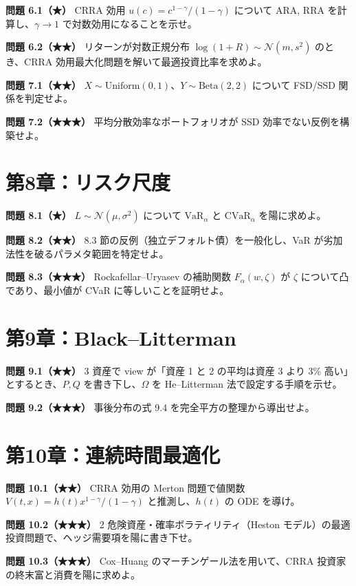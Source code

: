 \documentclass[11pt,a4paper]{report}
\begin{document}
\textbf{問題 6.1（★）} CRRA 効用 $u(c) = c^{1-\gamma}/(1-\gamma)$ について ARA, RRA を計算し、$\gamma \to 1$ で対数効用になることを示せ。

\textbf{問題 6.2（★★）} リターンが対数正規分布 $\log(1 + R) \sim \mathcal{N}(m, s^2)$ のとき、CRRA 効用最大化問題を解いて最適投資比率を求めよ。

\textbf{問題 7.1（★★）} $X \sim \mathrm{Uniform}(0,1)$、$Y \sim \mathrm{Beta}(2, 2)$ について FSD/SSD 関係を判定せよ。

\textbf{問題 7.2（★★★）} 平均分散効率なポートフォリオが SSD 効率でない反例を構築せよ。

\section{第8章：リスク尺度}

\textbf{問題 8.1（★）} $L \sim \mathcal{N}(\mu, \sigma^2)$ について $\mathrm{VaR}_\alpha$ と $\mathrm{CVaR}_\alpha$ を陽に求めよ。

\textbf{問題 8.2（★★）} 8.3 節の反例（独立デフォルト債）を一般化し、VaR が劣加法性を破るパラメタ範囲を特定せよ。

\textbf{問題 8.3（★★★）} Rockafellar–Uryasev の補助関数 $F_\alpha(w, \zeta)$ が $\zeta$ について凸であり、最小値が CVaR に等しいことを証明せよ。

\section{第9章：Black–Litterman}

\textbf{問題 9.1（★★）} 3 資産で view が「資産 1 と 2 の平均は資産 3 より 3\% 高い」とするとき、$P, Q$ を書き下し、$\Omega$ を He–Litterman 法で設定する手順を示せ。

\textbf{問題 9.2（★★★）} 事後分布の式 9.4 を完全平方の整理から導出せよ。

\section{第10章：連続時間最適化}

\textbf{問題 10.1（★★）} CRRA 効用の Merton 問題で値関数 $V(t, x) = h(t) x^{1-\gamma}/(1-\gamma)$ と推測し、$h(t)$ の ODE を導け。

\textbf{問題 10.2（★★★）} 2 危険資産・確率ボラティリティ（Heston モデル）の最適投資問題で、ヘッジ需要項を陽に書き下せ。

\textbf{問題 10.3（★★★）} Cox–Huang のマーチンゲール法を用いて、CRRA 投資家の終末富と消費を陽に求めよ。
\end{document}
